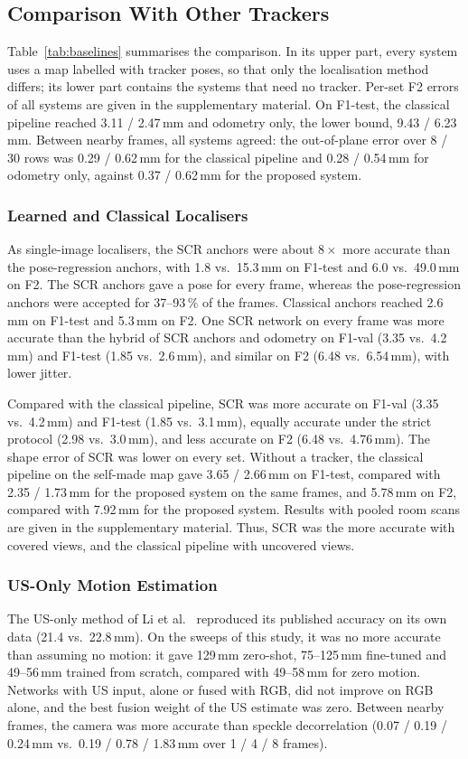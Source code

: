 \documentclass[9pt,shortpaper,twoside,web]{ieeecolor2}
\newcommand{\Fval}{F1-val}
\newcommand{\Ftest}{F1-test}
\newcommand{\Ftwo}{F2}
\begin{document}
\subsection{Comparison With Other Trackers}
\label{sec:res_compare}\label{sec:res_slam}
Table~\ref{tab:baselines} summarises the comparison. In its upper part, every system uses a map labelled with tracker poses, so that only the localisation method differs; its lower part contains the systems that need no tracker. Per-set \Ftwo{} errors of all systems are given in the supplementary material. On \Ftest{}, the classical pipeline reached 3.11 / 2.47\,mm and odometry only, the lower bound, 9.43 / 6.23\,mm. Between nearby frames, all systems agreed: the out-of-plane error over 8 / 30 rows was 0.29 / 0.62\,mm for the classical pipeline and 0.28 / 0.54\,mm for odometry only, against 0.37 / 0.62\,mm for the proposed system.

\subsubsection{Learned and Classical Localisers} As single-image localisers, the SCR anchors were about $8\times$ more accurate than the pose-regression anchors, with 1.8 vs.\ 15.3\,mm on \Ftest{} and 6.0 vs.\ 49.0\,mm on \Ftwo{}. The SCR anchors gave a pose for every frame, whereas the pose-regression anchors were accepted for 37--93\,\% of the frames. Classical anchors reached 2.6\,mm on \Ftest{} and 5.3\,mm on \Ftwo{}. One SCR network on every frame was more accurate than the hybrid of SCR anchors and odometry on \Fval{} (3.35 vs.\ 4.2\,mm) and \Ftest{} (1.85 vs.\ 2.6\,mm), and similar on \Ftwo{} (6.48 vs.\ 6.54\,mm), with lower jitter.

Compared with the classical pipeline, SCR was more accurate on \Fval{} (3.35 vs.\ 4.2\,mm) and \Ftest{} (1.85 vs.\ 3.1\,mm), equally accurate under the strict protocol (2.98 vs.\ 3.0\,mm), and less accurate on \Ftwo{} (6.48 vs.\ 4.76\,mm). The shape error of SCR was lower on every set. Without a tracker, the classical pipeline on the self-made map gave 3.65 / 2.66\,mm on \Ftest{}, compared with 2.35 / 1.73\,mm for the proposed system on the same frames, and 5.78\,mm on \Ftwo{}, compared with 7.92\,mm for the proposed system. Results with pooled room scans are given in the supplementary material. Thus, SCR was the more accurate with covered views, and the classical pipeline with uncovered views.

\subsubsection{US-Only Motion Estimation} The US-only method of Li et al.\ \cite{li2024longterm} reproduced its published accuracy on its own data (21.4 vs.\ 22.8\,mm). On the sweeps of this study, it was no more accurate than assuming no motion: it gave 129\,mm zero-shot, 75--125\,mm fine-tuned and 49--56\,mm trained from scratch, compared with 49--58\,mm for zero motion. Networks with US input, alone or fused with RGB, did not improve on RGB alone, and the best fusion weight of the US estimate was zero. Between nearby frames, the camera was more accurate than speckle decorrelation (0.07 / 0.19 / 0.24\,mm vs.\ 0.19 / 0.78 / 1.83\,mm over 1 / 4 / 8 frames).
\end{document}
